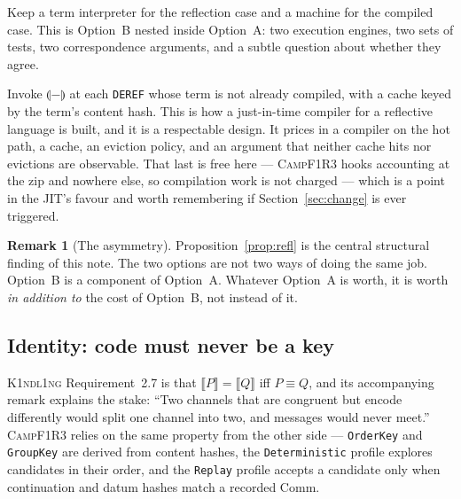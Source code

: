 \documentclass[11pt,a4paper]{article}
\newcommand{\code}[1]{\texttt{#1}}
\newcommand{\Kind}{\textsc{K1ndl1ng}}
\newcommand{\Camp}{\textsc{CampF1R3}}
\newcommand{\enc}[1]{\llbracket #1 \rrbracket}
\newcommand{\cmp}[1]{\llparenthesis #1 \rrparenthesis}
\theoremstyle{definition}
\newtheorem{remark}[definition]{Remark}
\theoremstyle{plain}
\begin{document}
\begin{description}[leftmargin=1.8em,style=nextline]
\item[Interpret on dereference.] Keep a term interpreter for the reflection
case and a machine for the compiled case. This is Option~B nested inside
Option~A: two execution engines, two sets of tests, two correspondence
arguments, and a subtle question about whether they agree.
\item[Compile on dereference.] Invoke $\cmp{-}$ at each \code{DEREF} whose term
is not already compiled, with a cache keyed by the term's content hash. This is
how a just-in-time compiler for a reflective language is built, and it is a
respectable design. It prices in a compiler on the hot path, a cache, an
eviction policy, and an argument that neither cache hits nor evictions are
observable. That last is free here --- \Camp{} hooks accounting at the zip and
nowhere else, so compilation work is not charged --- which is a point in the
JIT's favour and worth remembering if Section~\ref{sec:change} is ever
triggered.
\end{description}

\begin{remark}[The asymmetry]
Proposition~\ref{prop:refl} is the central structural finding of this note. The
two options are not two ways of doing the same job. Option~B is a component of
Option~A. Whatever Option~A is worth, it is worth \emph{in addition to} the cost
of Option~B, not instead of it.
\end{remark}

\subsection{Identity: code must never be a key}\label{sec:identity}

\Kind{} Requirement~2.7 is that $\enc{P}=\enc{Q}$ iff $P\equiv Q$, and its
accompanying remark explains the stake: ``Two channels that are congruent but
encode differently would split one channel into two, and messages would never
meet.'' \Camp{} relies on the same property from the other side --- \code{OrderKey}
and \code{GroupKey} are derived from content hashes, the \code{Deterministic}
profile explores candidates in their order, and the \code{Replay} profile
accepts a candidate only when continuation and datum hashes match a recorded
\textsf{Comm}.
\end{document}
